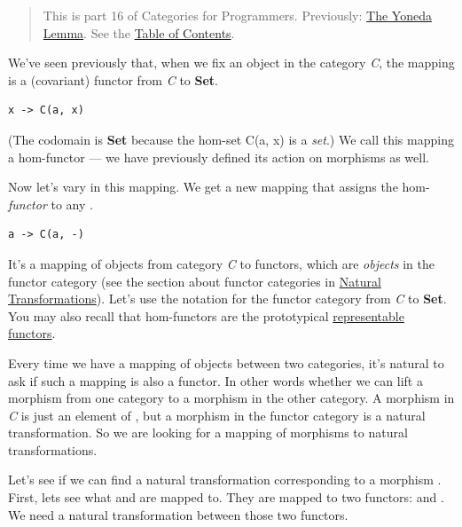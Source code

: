 \begin{quote}
This is part 16 of Categories for Programmers. Previously:
\href{https://bartoszmilewski.com/2015/09/01/the-yoneda-lemma/}{The
Yoneda Lemma}. See the
\href{https://bartoszmilewski.com/2014/10/28/category-theory-for-programmers-the-preface/}{Table
of Contents}.
\end{quote}

We've seen previously that, when we fix an object  in the
category \emph{C}, the mapping  is a (covariant)
functor from \emph{C} to \textbf{Set}.

\begin{Verbatim}[commandchars=\\\{\}]
x -> C(a, x)
\end{Verbatim}

(The codomain is \textbf{Set} because the hom-set C(a, x) is a
\emph{set}.) We call this mapping a hom-functor --- we have previously
defined its action on morphisms as well.

Now let's vary  in this mapping. We get a new mapping that
assigns the hom-\emph{functor}  to any .

\begin{Verbatim}[commandchars=\\\{\}]
a -> C(a, -)
\end{Verbatim}

It's a mapping of objects from category \emph{C} to functors, which are
\emph{objects} in the functor category (see the section about functor
categories in
\href{https://bartoszmilewski.com/2015/04/07/natural-transformations/}{Natural
Transformations}). Let's use the notation \code{{[}C,\ Set{]}} for the
functor category from \emph{C} to \textbf{Set}. You may also recall that
hom-functors are the prototypical
\href{https://bartoszmilewski.com/2015/07/29/representable-functors/}{representable
functors}.

Every time we have a mapping of objects between two categories, it's
natural to ask if such a mapping is also a functor. In other words
whether we can lift a morphism from one category to a morphism in the
other category. A morphism in \emph{C} is just an element of
, but a morphism in the functor category
\code{{[}C,\ Set{]}} is a natural transformation. So we are looking
for a mapping of morphisms to natural transformations.

Let's see if we can find a natural transformation corresponding to a
morphism . First, lets see what
 and  are mapped to. They are mapped to two
functors:  and . We need a natural
transformation between those two functors.

